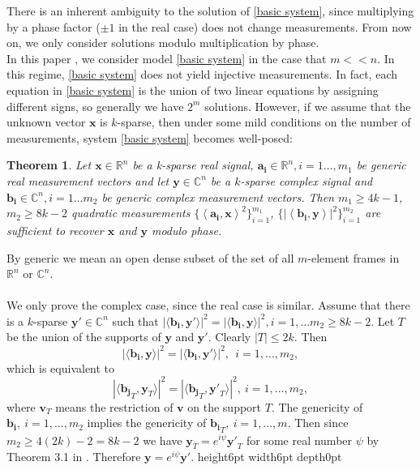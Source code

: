 \documentclass[11pt]{article}
\newtheorem{theorem}{Theorem}[section]
\newcommand{\<}{\langle}
\renewcommand{\>}{\rangle}
\newcommand{\vct}[1]{\bm{#1}}
\numberwithin{equation}{section}
\def \endprf{\hfill {\vrule height6pt width6pt depth0pt}\medskip}
\newenvironment{proof}{\noindent {\bf Proof} }{\endprf\par}
\begin{document}
There is an inherent ambiguity to the solution of \eqref{basic system}, since multiplying by a phase factor ($\pm 1$ in the real case) does 
not change measurements. From now on, we only consider solutions modulo multiplication by phase. \\

In this paper , we consider model \eqref{basic system} in the case that $m<<n$. In this regime, \eqref{basic system} does not yield injective 
measurements. In fact, each equation in \eqref{basic system} is the union of two linear equations by assigning different signs, so generally we have $2^m$ solutions. However, if we assume that the unknown vector $\vct{x}$ is $k$-sparse, then under some mild conditions on the number of measurements, system \eqref{basic system} becomes well-posed:


\begin{theorem}
\label{well-posedness}
Let $\vct{x} \in \mathbb{R}^{n}$ be a k-sparse real signal, $\vct{a_i} \in \mathbb{R}^n , i = 1\ldots, m_1$ be generic real 
measurement vectors and let $\vct{y} \in \mathbb{C}^{n}$ be a $k$-sparse complex signal and $\vct{b_i} \in 
\mathbb{C}^n, i = 1\ldots m_2$ be generic complex measurement vectors. Then $m_1 \geq 4k-1$, $m_2 \geq 8k-2$ quadratic 
measurements $\{\left \langle\vct{a_i}, \vct{x}\right \rangle^2\}_{i=1}^{m_1}$, $\{|\left \langle\vct{b_i}, \vct{y}\right \rangle|^2\}_{i=1}^
{m_2}$ 
are sufficient to recover $\vct{x}$ and $\vct{y}$ modulo phase.
\end{theorem}
By generic we mean an open dense subset of the set of all $m$-element frames in $\mathbb{R}^n$ or $\mathbb{C}^n$.\\
\\
\begin{proof}
We only prove the complex case, since the real case is similar. Assume that there is a $k$-sparse $\vct{y'} \in \mathbb{C}^n$ 
such that $\left|\langle\vct{b_i}, \vct{y'} \rangle \right|^2 = \left| \langle \vct{b_i}, \vct{y} \rangle \right|^2, i = 1,\ldots m_2 \geq 
8k-2$. Let 
$T$ be the union of the supports of $\vct{y}$ and $\vct{y'}$. Clearly $|T| \leq 2k$. Then
\[
\left|\langle\vct{b_i}, \vct{y} \rangle \right|^2=\left| \langle \vct{b_i}, \vct{y'} \rangle \right|^2, ~~i=1,\ldots,m_2, 
\]
which is equivalent to 
\[
\left|\langle {\vct{b_j}}_T, \vct{y}_T \rangle \right|^2=\left| \langle {\vct{b_j}}_T, \vct{y'}_T \rangle \right|^2, ~i=1,...,m_2,
\]
where $\vct{v}_T$ means the restriction of $\vct{v}$ on the support $T$. The genericity of $\vct{b_i}, ~i=1,...,m_2$ implies the 
genericity of ${\vct{b_i}}_T, ~i=1,...,m$. Then since $m_2 \geq4(2k)-2 = 8k-2$ we have $\vct{y}_T=e^{i\psi}\vct{y'}
_T$ 
for some real number $\psi$ by Theorem 3.1 in \cite{Edidin}. Therefore $\vct{y}=e^{i\psi}\vct{y'}$. 
\end{proof}
\end{document}
